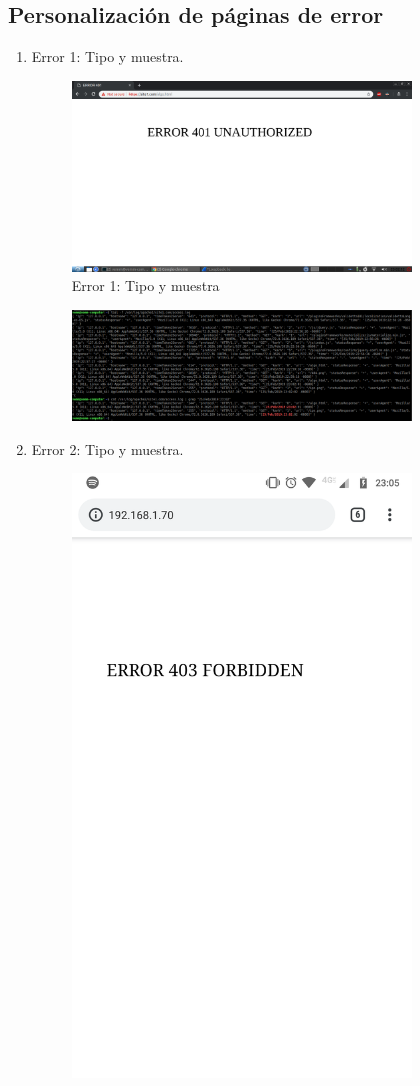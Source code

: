 \subsection{Personalización de páginas de error}
	\begin{enumerate}
		\item Error 1: Tipo y muestra.
			\begin{figure}[htbp]
				\centering
				\includegraphics[width=9cm]{./img/lista/12.png}
				\caption[Error 1: Tipo y muestra]{Error 1: Tipo y muestra}
				\label{fig:12}
			\end{figure}
			\begin{figure}[htbp]
			\centering
				\includegraphics[width=9cm]{./img/lista/12_1.png}
				\label{fig:12.1}
			\end{figure}
		\item Error 2: Tipo y muestra.
			\begin{figure}[htbp]
				\centering
				\includegraphics[width=9cm]{./img/lista/13.png}

\end{figure}
\end{enumerate}
